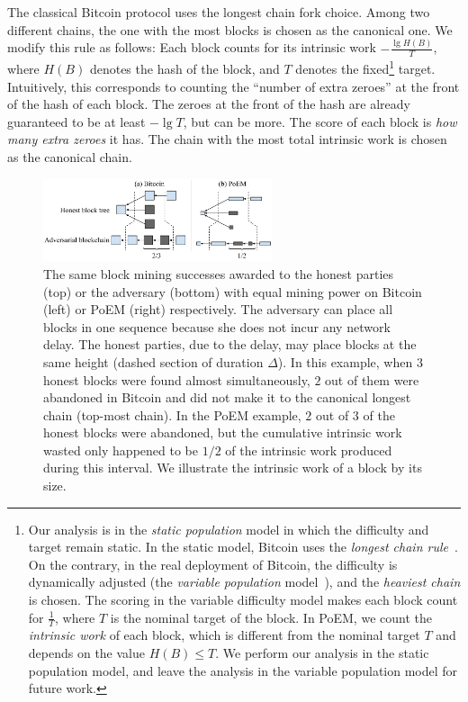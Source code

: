 \noindent
{}
The classical Bitcoin protocol uses the longest chain fork choice. Among two different
chains, the one with the most blocks is chosen as the canonical one. We modify this
rule as follows: Each block counts for its intrinsic work $-\frac{\lg H(B)}{T}$,
where $H(B)$ denotes the hash of the block, and $T$ denotes the fixed\footnote{Our
analysis is in the \emph{static population} model in which the difficulty
and target remain static. In the static model, Bitcoin uses the \emph{longest chain rule}~\cite{backbone}.
On the contrary, in the real deployment of Bitcoin, the difficulty is dynamically adjusted (the
\emph{variable population} model~\cite{varbackbone}), and the \emph{heaviest chain} is chosen.
The scoring in the variable difficulty model makes each block count for $\frac{1}{T}$, where
$T$ is the nominal target of the block. In PoEM, we count the \emph{intrinsic work}
of each block, which is different from the nominal target $T$ and depends on the value $H(B) \leq T$.
We perform our analysis in the static population model, and leave the analysis in the variable
population model for future work.} target. Intuitively, this corresponds to counting the
``number of extra zeroes'' at the front of the hash of each block. The zeroes at the front of the hash are already guaranteed
to be at least $-\lg T$, but can be more. The score of each block is \emph{how many extra zeroes}
it has. The chain with the most total intrinsic work is chosen as the canonical chain.

\begin{figure}
  \centering
  \includegraphics[width=0.6\textwidth,keepaspectratio]{figures/poem_work_wasted.pdf}
  \caption{The same block mining successes awarded to the honest parties (top) or the adversary (bottom)
           with equal mining power on Bitcoin (left) or PoEM (right) respectively. The adversary can place
           all blocks in one sequence because she does not incur any network delay. The honest parties,
           due to the delay, may place blocks at the same height (dashed section of duration $\Delta$).
           In this example, when $3$ honest blocks were found almost simultaneously, $2$ out of
           them were abandoned in Bitcoin and did not make it to the canonical longest chain
           (top-most chain).
           In the PoEM example, $2$ out of $3$ of the honest blocks were abandoned, but the cumulative intrinsic
           work wasted only happened to be $1/2$ of the intrinsic work produced during this interval.
           We illustrate the intrinsic work of a block by its size.}
  \label{fig:poem-wasted-work}
\end{figure}

